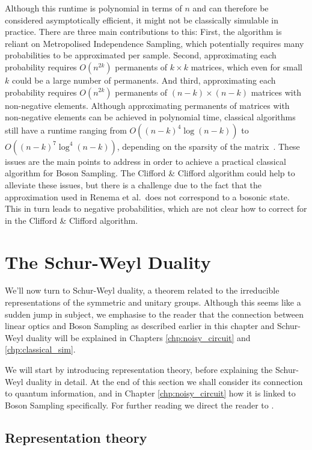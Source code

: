 Although this runtime is polynomial in terms of $n$ and can therefore be considered asymptotically efficient, it might not be classically simulable in practice. 
There are three main contributions to this: 
First, the algorithm is reliant on Metropolised Independence Sampling, which potentially requires many probabilities to be approximated per sample. 
Second, approximating each probability requires $O(n^{2k})$ permanents of $k\times k$ matrices, which even for small $k$ could be a large number of permanents. 
And third, approximating each probability requires $O(n^{2k})$ permanents of $(n-k)\times(n-k)$ matrices with non-negative elements. 
Although approximating permanents of matrices with non-negative elements can be achieved in polynomial time, classical algorithms still have a runtime ranging from $O((n-k)^4\log(n-k))$ to $O((n-k)^{7}\log^4(n-k))$, depending on the sparsity of the matrix~\cite{huber2008}. These issues are the main points to address in order to achieve a practical classical algorithm for Boson Sampling. The Clifford \& Clifford algorithm could help to alleviate these issues, but there is a challenge due to the fact that the approximation used in Renema et al.\ does not correspond to a bosonic state. 
This in turn leads to negative probabilities, which are not clear how to correct for in the Clifford \& Clifford algorithm.

\section{The Schur-Weyl Duality}
\label{sec:sw-duality}

We'll now turn to Schur-Weyl duality, a theorem related to the irreducible representations of the symmetric and unitary groups. Although this seems like a sudden jump in subject, we emphasise to the reader that the connection between linear optics and Boson Sampling as described earlier in this chapter and Schur-Weyl duality will be explained in Chapters \ref{chp:noisy_circuit} and \ref{chp:classical_sim}.

We will start by introducing representation theory, before explaining the Schur-Weyl duality in detail. At the end of this section we shall consider its connection to quantum information, and in Chapter \ref{chp:noisy_circuit} how it is linked to Boson Sampling specifically. For further reading we direct the reader to \cite{fulton2004, harrow2005}.

\subsection{Representation theory}

